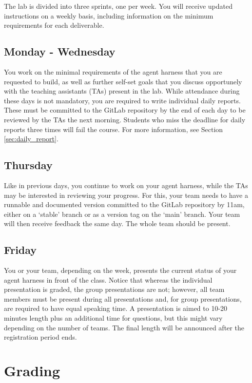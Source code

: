 \documentclass{article}
\begin{document}
The lab is divided into three sprints, one per week. You will receive updated instructions on a weekly basis, including information on the minimum requirements for each deliverable.

\subsection{Monday - Wednesday}

You work on the minimal requirements of the agent harness that you are requested to build, as well as further self-set goals that you discuss opportunely with the teaching assistants (TAs) present in the lab. While attendance during these days is not mandatory, you are required to write individual daily reports. These must be committed to the GitLab repository by the end of each day to be reviewed by the TAs the next morning. Students who miss the deadline for daily reports three times will fail the course. For more information, see Section \ref{sec:daily_report}.

\subsection{Thursday}

Like in previous days, you continue to work on your agent harness, while the TAs may be interested in reviewing your progress. For this, your team needs to have a runnable and documented version committed to the GitLab repository by 11am, either on a `stable' branch or as a version tag on the `main' branch. Your team will then receive feedback the same day. The whole team should be present.

\subsection{Friday}

You or your team, depending on the week, presents the current status of your agent harness in front of the class. Notice that whereas the individual presentation is graded, the group presentations are not; however, all team members must be present during all presentations and, for group presentations, are required to have equal speaking time. A presentation is aimed to 10-20 minutes length plus an additional time for questions, but this might vary depending on the number of teams. The final length will be announced after the registration period ends.

\section{Grading}
\end{document}
